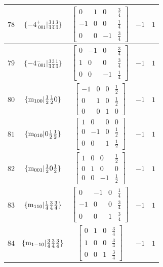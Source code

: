 \documentclass[fleqn,8pt]{jsarticle}
\begin{document}
\begin{longtable}{ccccc}
$ 78 $ & $ \{-4^{+}_{\,\,001}|\frac{3}{4} \frac{1}{4} \frac{3}{4}\} $ & $ \begin{bmatrix} 0 & 1 & 0 & \frac{3}{4} \\ -1 & 0 & 0 & \frac{1}{4} \\ 0 & 0 & -1 & \frac{3}{4} \end{bmatrix} $ & $ -1 $ & $ 1 $ \\ \hline
$ 79 $ & $ \{-4^{-}_{\,\,001}|\frac{3}{4} \frac{3}{4} \frac{1}{4}\} $ & $ \begin{bmatrix} 0 & -1 & 0 & \frac{3}{4} \\ 1 & 0 & 0 & \frac{3}{4} \\ 0 & 0 & -1 & \frac{1}{4} \end{bmatrix} $ & $ -1 $ & $ 1 $ \\ \hline
$ 80 $ & $ \{{\rm m}_{100}|\frac{1}{2} \frac{1}{2} 0\} $ & $ \begin{bmatrix} -1 & 0 & 0 & \frac{1}{2} \\ 0 & 1 & 0 & \frac{1}{2} \\ 0 & 0 & 1 & 0 \end{bmatrix} $ & $ -1 $ & $ 1 $ \\ \hline
$ 81 $ & $ \{{\rm m}_{010}|0 \frac{1}{2} \frac{1}{2}\} $ & $ \begin{bmatrix} 1 & 0 & 0 & 0 \\ 0 & -1 & 0 & \frac{1}{2} \\ 0 & 0 & 1 & \frac{1}{2} \end{bmatrix} $ & $ -1 $ & $ 1 $ \\ \hline
$ 82 $ & $ \{{\rm m}_{001}|\frac{1}{2} 0 \frac{1}{2}\} $ & $ \begin{bmatrix} 1 & 0 & 0 & \frac{1}{2} \\ 0 & 1 & 0 & 0 \\ 0 & 0 & -1 & \frac{1}{2} \end{bmatrix} $ & $ -1 $ & $ 1 $ \\ \hline
$ 83 $ & $ \{{\rm m}_{110}|\frac{1}{4} \frac{3}{4} \frac{3}{4}\} $ & $ \begin{bmatrix} 0 & -1 & 0 & \frac{1}{4} \\ -1 & 0 & 0 & \frac{3}{4} \\ 0 & 0 & 1 & \frac{3}{4} \end{bmatrix} $ & $ -1 $ & $ 1 $ \\ \hline
$ 84 $ & $ \{{\rm m}_{1-10}|\frac{3}{4} \frac{3}{4} \frac{3}{4}\} $ & $ \begin{bmatrix} 0 & 1 & 0 & \frac{3}{4} \\ 1 & 0 & 0 & \frac{3}{4} \\ 0 & 0 & 1 & \frac{3}{4} \end{bmatrix} $ & $ -1 $ & $ 1 $ \\ \hline

\end{longtable}
\end{document}
